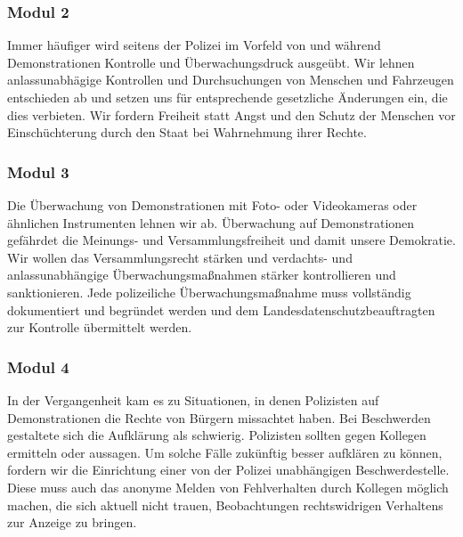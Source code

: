 \subsubsection{Modul 2}
\abstimmung
Immer häufiger wird seitens der Polizei im Vorfeld von und während Demonstrationen Kontrolle und Überwachungsdruck ausgeübt. Wir lehnen anlassunabhägige Kontrollen und Durchsuchungen von Menschen und Fahrzeugen entschieden ab und setzen uns für entsprechende gesetzliche Änderungen ein, die dies verbieten. Wir fordern Freiheit statt Angst und den Schutz der Menschen vor Einschüchterung durch den Staat bei Wahrnehmung ihrer Rechte.

\subsubsection{Modul 3}
\abstimmung
Die Überwachung von Demonstrationen mit Foto- oder Videokameras oder ähnlichen Instrumenten lehnen wir ab. Überwachung auf Demonstrationen gefährdet die Meinungs- und Versammlungsfreiheit und damit unsere Demokratie. Wir wollen das Versammlungsrecht stärken und verdachts- und anlassunabhängige Überwachungsmaßnahmen stärker kontrollieren und sanktionieren. Jede polizeiliche Überwachungsmaßnahme muss vollständig dokumentiert und begründet werden und dem Landesdatenschutzbeauftragten zur Kontrolle übermittelt werden.

\subsubsection{Modul 4}
\abstimmung
In der Vergangenheit kam es zu Situationen, in denen Polizisten auf Demonstrationen die Rechte von Bürgern missachtet haben. Bei Beschwerden gestaltete sich die Aufklärung als schwierig. Polizisten sollten gegen Kollegen ermitteln oder aussagen. Um solche Fälle zukünftig besser aufklären zu können, fordern wir die Einrichtung einer von der Polizei unabhängigen Beschwerdestelle. Diese muss auch das anonyme Melden von Fehlverhalten durch Kollegen möglich machen, die sich aktuell nicht trauen, Beobachtungen rechtswidrigen Verhaltens zur Anzeige zu bringen.
